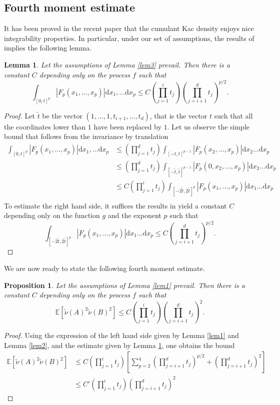 \documentclass[11pt,a4paper]{article}
\newcommand\E{\mathbb{E}}
\newcommand\dd{\mathrm{d}}
\newcommand\nut{\tilde{\nu}}
\numberwithin{equation}{section}
\theoremstyle{plain}
\theoremstyle{plain}
\theoremstyle{plain}
\newtheorem{lemm}[theo]{Lemma}
\newenvironment{lemma}%
  {\begin{mdframed}[backgroundcolor=white]\begin{lemm}}%
  {\end{lemm}\par\vspace{0.cm}\end{mdframed}}
\theoremstyle{plain}
\newtheorem{prop}[theo]{Proposition}
\newenvironment{proposition}%
  {\begin{mdframed}[backgroundcolor=white]\begin{prop}}%
  {\end{prop}\par\vspace{0.cm}\end{mdframed}}
\theoremstyle{definition}
\theoremstyle{definition}
\begin{document}
\subsection{Fourth moment estimate}
It has been proved in the recent paper \cite{Anc24} that the cumulant Kac density enjoys nice integrability properties. In particular, under our set of assumptions, the results of \cite[Sec. 7.3]{Anc24} implies the following lemma.
\begin{lemma}
\label{lem4}
 Let the assumptions of Lemma \ref{lem3} prevail. Then there is a constant $C$ depending only on the process $f$ such that
\[\int_{[0,t]^p} |F_p(x_1,\ldots,x_p)|\dd x_1,\ldots\dd x_p\leq C\left(\prod_{j=1}^i t_j\right)\left(\prod_{j=i+1}^d t_j\right)^{p/2}.\]\end{lemma}
\begin{proof}
Let $\tilde{t}$ be the vector $(1,\ldots,1,t_{i+1},\ldots,t_d)$, that is the vector $t$ such that all the coordinates lower than $1$ have been replaced by $1$. Let us observe the simple bound that follows from the invariance by translation
\begin{align*}
\int_{[0,t]^p} |F_p(x_1,\ldots,x_p)|\dd x_1,\ldots\dd x_p&\leq \left(\prod_{j=1}^d t_j\right)\int_{[-t,t]^{p-1}} |F_p(x_2,\ldots,x_p)|\dd x_2 \ldots\dd x_p\\
&\leq \left(\prod_{j=1}^d t_j\right)\int_{[-\tilde{t},\tilde{t}]^{p-1}} |F_p(0,x_2,\ldots,x_p)|\dd x_2\ldots\dd x_p\\
&\leq C\left(\prod_{j=1}^it_j\right)\int_{[-2\tilde{t},2\tilde{t}]^p} |F_p(x_1,\ldots,x_p)|\dd x_1\ldots\dd x_p\\
\end{align*}
To estimate the right hand side, it suffices the results in \cite[Sec. 7.3]{Anc24} yield a constant $C$ depending only on the function $g$ and the exponent $p$ such that
\[\int_{[-2\tilde{t},2\tilde{t}]^p} |F_p(x_1,\ldots,x_p)|\dd x_1\ldots\dd x_p\leq C\left(\prod_{j=i+1}^d t_j\right)^{p/2}.\]
\end{proof}
We are now ready to state the following fourth moment estimate.
\begin{proposition}
\label{prop2} Let the assumptions of Lemma \ref{lem1} prevail. Then there is a constant $C$ depending only on the process $f$ such that
\[\E[\nut(A)^2\nut(B)^2]\leq C\left(\prod_{j=1}^i t_j\right)\left(\prod_{j=i+1}^d t_j\right)^2.\]
\end{proposition}
\begin{proof}
Using the expression of the left hand side given by Lemma \ref{lem1} and Lemma \ref{lem2}, and the estimate given by Lemma \ref{lem4}, one obtains the bound
\begin{align*}
\E[\nut(A)^2\nut(B)^2]&\leq C\left(\prod_{j=1}^i t_j\right)\left[\sum_{p=2}^4 \left(\prod_{j=i+1}^d t_j\right)^{p/2} + \left(\prod_{j=i+1}^d t_j\right)^2\right]\\
&\leq C'\left(\prod_{j=1}^i t_j\right)\left(\prod_{j=i+1}^d t_j\right)^2
\end{align*}
\end{proof}
\end{document}
